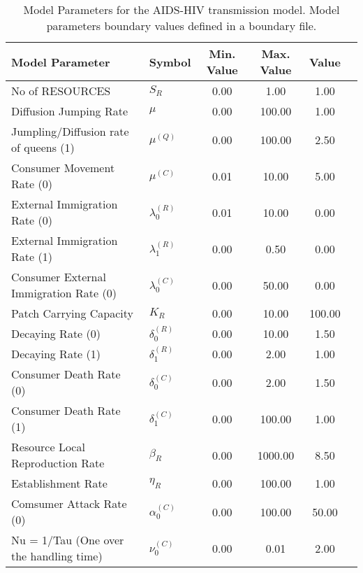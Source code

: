 \begin{table}
\centering
\begin{tabular}{p{5cm}lcccc}
{\bf Model Parameter} & {\bf Symbol} & {\bf Min. Value} & {\bf Max. Value} & {\bf Value}\\
\hline\hline
No of RESOURCES & $S_R$ & 0.00 & 1.00 & 1.00\\
Diffusion Jumping Rate & $\mu$ & 0.00 & 100.00 & 1.00\\
Jumpling/Diffusion rate of queens (1) & $\mu^{(Q)}$ & 0.00 & 100.00 & 2.50\\
Consumer Movement Rate (0) & $\mu^{(C)}$ & 0.01 & 10.00 & 5.00\\
External Immigration Rate (0) & $\lambda^{(R)}_0$ & 0.01 & 10.00 & 0.00\\
External Immigration Rate (1) & $\lambda^{(R)}_1$ & 0.00 & 0.50 & 0.00\\
Consumer External Immigration Rate (0) & $\lambda^{(C)}_0$ & 0.00 & 50.00 & 0.00\\
Patch Carrying Capacity & $K_R$ & 0.00 & 10.00 & 100.00\\
Decaying Rate (0) & $\delta^{(R)}_0$ & 0.00 & 10.00 & 1.50\\
Decaying Rate (1) & $\delta^{(R)}_1$ & 0.00 & 2.00 & 1.00\\
Consumer Death Rate (0) & $\delta^{(C)}_0$ & 0.00 & 2.00 & 1.50\\
Consumer Death Rate (1) & $\delta^{(C)}_1$ & 0.00 & 100.00 & 1.00\\
Resource Local Reproduction Rate & $\beta_R$ & 0.00 & 1000.00 & 8.50\\
Establishment Rate & $\eta_R$ & 0.00 & 100.00 & 1.00\\
Comsumer Attack Rate (0) & $\alpha^{(C)}_0$ & 0.00 & 100.00 & 50.00\\
Nu = 1/Tau (One over the handling time) & $\nu^{(C)}_0$ & 0.00 & 0.01 & 2.00\\
\hline\hline
\end{tabular}
\caption{Model Parameters for the AIDS-HIV transmission model. Model parameters boundary values defined in a boundary file.}
\end{table}
